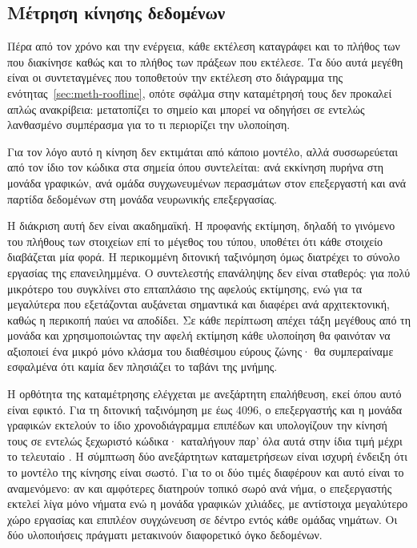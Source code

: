 \subsection{Μέτρηση κίνησης δεδομένων}
\label{sec:meth-traffic}

Πέρα από τον χρόνο και την ενέργεια, κάθε εκτέλεση καταγράφει και το πλήθος των
 που διακίνησε καθώς και το πλήθος των πράξεων που εκτέλεσε. Τα δύο
αυτά μεγέθη είναι οι συντεταγμένες που τοποθετούν την εκτέλεση στο διάγραμμα της
ενότητας~\ref{sec:meth-roofline}, οπότε σφάλμα στην καταμέτρησή τους δεν
προκαλεί απλώς ανακρίβεια: μετατοπίζει το σημείο και μπορεί να οδηγήσει σε
εντελώς λανθασμένο συμπέρασμα για το τι περιορίζει την υλοποίηση.

Για τον λόγο αυτό η κίνηση δεν εκτιμάται από κάποιο μοντέλο, αλλά συσσωρεύεται
από τον ίδιο τον κώδικα στα σημεία όπου συντελείται: ανά εκκίνηση πυρήνα στη
μονάδα γραφικών, ανά ομάδα συγχωνευμένων περασμάτων στον επεξεργαστή και ανά
παρτίδα δεδομένων στη μονάδα νευρωνικής επεξεργασίας.

Η διάκριση αυτή δεν είναι ακαδημαϊκή. Η προφανής εκτίμηση, δηλαδή το γινόμενο
του πλήθους των στοιχείων επί το μέγεθος του τύπου, υποθέτει ότι κάθε στοιχείο
διαβάζεται μία φορά. Η περικομμένη διτονική ταξινόμηση όμως διατρέχει το σύνολο
εργασίας της επανειλημμένα. Ο συντελεστής επανάληψης δεν είναι σταθερός: για
 πολύ μικρότερο του  συγκλίνει στο επταπλάσιο της αφελούς εκτίμησης,
ενώ για τα μεγαλύτερα  που εξετάζονται αυξάνεται σημαντικά και διαφέρει
ανά αρχιτεκτονική, καθώς η περικοπή παύει να αποδίδει. Σε κάθε περίπτωση απέχει
τάξη μεγέθους από τη μονάδα και χρησιμοποιώντας την αφελή εκτίμηση κάθε
υλοποίηση θα φαινόταν να αξιοποιεί ένα μικρό μόνο κλάσμα του διαθέσιμου εύρους
ζώνης· θα συμπεραίναμε εσφαλμένα ότι καμία δεν πλησιάζει το ταβάνι της μνήμης.

Η ορθότητα της καταμέτρησης ελέγχεται με ανεξάρτητη επαλήθευση, εκεί όπου αυτό
είναι εφικτό. Για τη διτονική ταξινόμηση με  έως 4096, ο επεξεργαστής και
η μονάδα γραφικών εκτελούν το ίδιο χρονοδιάγραμμα επιπέδων και υπολογίζουν την
κίνησή τους σε εντελώς ξεχωριστό κώδικα· καταλήγουν παρ' όλα αυτά στην ίδια τιμή
μέχρι το τελευταίο . Η σύμπτωση δύο ανεξάρτητων καταμετρήσεων είναι
ισχυρή ένδειξη ότι το μοντέλο της κίνησης είναι σωστό. Για το  οι
δύο τιμές διαφέρουν και αυτό είναι το αναμενόμενο: αν και αμφότερες διατηρούν
τοπικό σωρό ανά νήμα, ο επεξεργαστής εκτελεί λίγα μόνο νήματα ενώ η μονάδα
γραφικών χιλιάδες, με αντίστοιχα μεγαλύτερο χώρο εργασίας και επιπλέον
συγχώνευση σε δέντρο εντός κάθε ομάδας νημάτων. Οι δύο υλοποιήσεις πράγματι
μετακινούν διαφορετικό όγκο δεδομένων.

